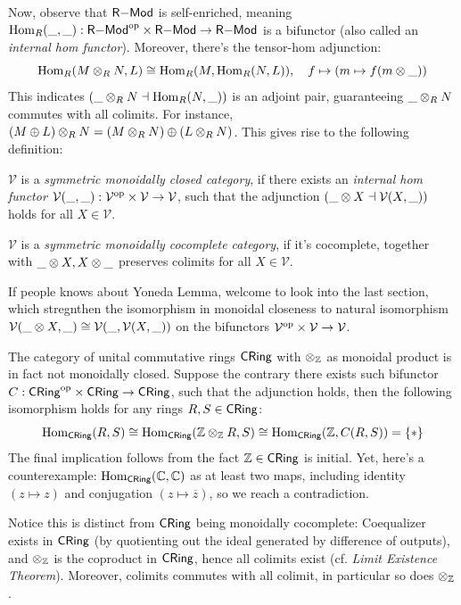 \documentclass{article}
\begin{document}
\hfil

Now, observe that $\mathsf{R}\mathrm{-}\mathsf{Mod}$ is self-enriched, meaning $\mathrm{Hom}_R (\_,\_):\mathsf{R}\mathrm{-}\mathsf{Mod}^{\mathrm{op}}\times \mathsf{R}\mathrm{-}\mathsf{Mod}\rightarrow\mathsf{R}\mathrm{-}\mathsf{Mod}$ is a bifunctor (also called an \emph{internal hom functor}). Moreover, there's the tensor-hom adjunction:
\[\mathrm{Hom}_R (M\otimes_R N,L)\cong \mathrm{Hom}_R (M,\mathrm{Hom}_R (N,L)),\quad f\mapsto (m\mapsto f(m\otimes\_))\]
This indicates $(\_\otimes_R N\dashv \mathrm{Hom}_R (N,\_))$ is an adjoint pair, guaranteeing $\_\otimes_R N$ commutes with all colimits. For instance, $(M\oplus L)\otimes_R N=(M\otimes_R N)\oplus (L\otimes_R N)$. This gives rise to the following definition:
\begin{defn}
    $\mathcal{V}$ is a \emph{symmetric monoidally closed category}, if there exists an \emph{internal hom functor} $\mathcal{V}(\_,\_):\mathcal{V}^{\mathrm{op}}\times \mathcal{V}\rightarrow\mathcal{V}$, such that the adjunction $(\_\otimes X\dashv \mathcal{V}(X,\_))$ holds for all $X\in\mathcal{V}$.

    $\mathcal{V}$ is a \emph{symmetric monoidally cocomplete category}, if it's cocomplete, together with $\_\otimes X,X\otimes \_$ preserves colimits for all $X\in\mathcal{V}$.
\end{defn}

If people knows about Yoneda Lemma, welcome to look into the last section, which stregnthen the isomorphism in monoidal closeness to natural isomorphism $\mathcal{V}(\_\otimes X,\_)\cong \mathcal{V}(\_,\mathcal{V}(X,\_))$ on the bifunctors $\mathcal{V}^{\mathrm{op}}\times \mathcal{V}\rightarrow\mathcal{V}$.

\hfil

\begin{exmp}
    The category of unital commutative rings $\mathsf{CRing}$ with $\otimes_{\mathbb{Z}}$ as monoidal product is in fact not monoidally closed. Suppose the contrary there exists such bifunctor $C:\mathsf{CRing}^{\mathrm{op}}\times\mathsf{CRing}\rightarrow\mathsf{CRing}$, such that the adjunction holds, then the following isomorphism holds for any rings $R,S\in\mathsf{CRing}$:
    \[\mathrm{Hom}_{\mathsf{CRing}} (R,S)\cong\mathrm{Hom}_{\mathsf{CRing}}(\mathbb{Z}\otimes_{\mathbb{Z}} R,S)\cong \mathrm{Hom}_{\mathsf{CRing}} (\mathbb{Z},C(R,S)) = \{*\}\]
    The final implication follows from the fact $\mathbb{Z}\in\mathsf{CRing}$ is initial. Yet, here's a counterexample: $\mathrm{Hom}_{\mathsf{CRing}} (\mathbb{C},\mathbb{C})$ as at least two maps, including identity $(z\mapsto z)$ and conjugation $(z\mapsto \overline{z})$, so we reach a contradiction.

    Notice this is distinct from $\mathsf{CRing}$ being monoidally cocomplete: Coequalizer exists in $\mathsf{CRing}$ (by quotienting out the ideal generated by difference of outputs), and $\otimes_{\mathbb{Z}}$ is the coproduct in $\mathsf{CRing}$, hence all colimits exist (cf. \emph{Limit Existence Theorem}). Moreover, colimits commutes with all colimit, in particular so does $\otimes_{\mathbb{Z}}$.
\end{exmp}
\end{document}

